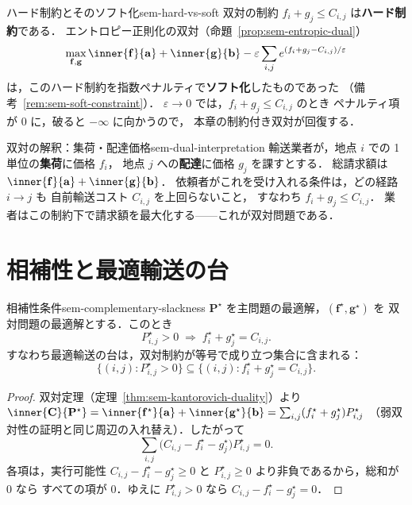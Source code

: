 \begin{remark}{ハード制約とそのソフト化}{sem-hard-vs-soft}
  双対の制約 $f_i + g_j \leq C_{i,j}$ は\textbf{ハード制約}である．
  エントロピー正則化の双対（命題~\ref{prop:sem-entropic-dual}）
  \[
    \max_{\mathbf{f}, \mathbf{g}}
    \inner{\mathbf{f}}{\mathbf{a}} + \inner{\mathbf{g}}{\mathbf{b}}
    - \varepsilon \sum_{i,j} e^{(f_i + g_j - C_{i,j})/\varepsilon}
  \]
  は，このハード制約を指数ペナルティで\textbf{ソフト化}したものであった
  （備考~\ref{rem:sem-soft-constraint}）．
  $\varepsilon \to 0$ では，$f_i + g_j \leq C_{i,j}$ のとき
  ペナルティ項が $0$ に，破ると $-\infty$ に向かうので，
  本章の制約付き双対が回復する．
\end{remark}

\begin{remark}{双対の解釈：集荷・配達価格}{sem-dual-interpretation}
  輸送業者が，地点 $i$ での 1 単位の\textbf{集荷}に価格 $f_i$，
  地点 $j$ への\textbf{配達}に価格 $g_j$ を課すとする．
  総請求額は $\inner{\mathbf{f}}{\mathbf{a}} + \inner{\mathbf{g}}{\mathbf{b}}$．
  依頼者がこれを受け入れる条件は，どの経路 $i \to j$ も
  自前輸送コスト $C_{i,j}$ を上回らないこと，
  すなわち $f_i + g_j \leq C_{i,j}$．
  業者はこの制約下で請求額を最大化する——これが双対問題である．
\end{remark}

\section{相補性と最適輸送の台}
\label{sec:sem-complementary-slackness}

\begin{proposition}{相補性条件}{sem-complementary-slackness}
  $\mathbf{P}^\star$ を主問題の最適解，$(\mathbf{f}^\star, \mathbf{g}^\star)$ を
  双対問題の最適解とする．このとき
  \[
    P^\star_{i,j} > 0
    \;\Longrightarrow\;
    f^\star_i + g^\star_j = C_{i,j}.
  \]
  すなわち最適輸送の台は，双対制約が等号で成り立つ集合に含まれる：
  \[
    \{(i,j) : P^\star_{i,j} > 0\}
    \subseteq
    \{(i,j) : f^\star_i + g^\star_j = C_{i,j}\}.
  \]
\end{proposition}

\begin{proof}
  双対定理（定理~\ref{thm:sem-kantorovich-duality}）より
  $\inner{\mathbf{C}}{\mathbf{P}^\star}
  = \inner{\mathbf{f}^\star}{\mathbf{a}} + \inner{\mathbf{g}^\star}{\mathbf{b}}
  = \sum_{i,j}(f^\star_i + g^\star_j)P^\star_{i,j}$
  （弱双対性の証明と同じ周辺の入れ替え）．したがって
  \[
    \sum_{i,j}\bigl(C_{i,j} - f^\star_i - g^\star_j\bigr)P^\star_{i,j} = 0.
  \]
  各項は，実行可能性 $C_{i,j} - f^\star_i - g^\star_j \geq 0$ と
  $P^\star_{i,j} \geq 0$ より非負であるから，総和が $0$ なら
  すべての項が $0$．ゆえに $P^\star_{i,j} > 0$ なら
  $C_{i,j} - f^\star_i - g^\star_j = 0$．
\end{proof}

